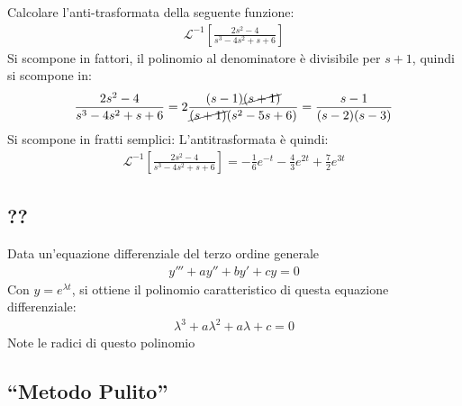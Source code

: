 \documentclass{article}
\numberwithin{equation}{subsection}
\begin{document}
Calcolare l'anti-trasformata della seguente funzione:
\begin{gather*}
    \mathscr{L}^{-1}\left[\frac{2s^2-4}{s^3-4s^2+s+6}\right]
\end{gather*}
Si scompone in fattori, il polinomio al denominatore è divisibile per $s+1$, quindi si scompone in:
\begin{gather*}
    \frac{2s^2-4}{s^3-4s^2+s+6}=2\frac{(s-1)\cancel{(s+1)}}{\cancel{(s+1)}(s^2-5s+6)}=\frac{s-1}{(s-2)(s-3)}
\end{gather*}
Si scompone in fratti semplici:
L'antitrasformata è quindi:
\begin{gather*}
    \mathscr{L}^{-1}\left[\frac{2s^2-4}{s^3-4s^2+s+6}\right]=-\frac{1}{6}e^{-t}-\frac{4}{3}e^{2t}+\frac{7}{2}e^{3t}
\end{gather*}


\subsection{??}

Data un'equazione differenziale del terzo ordine generale
\begin{gather*}
    y'''+ay''+by'+cy=0
\end{gather*}
Con $y=e^{\lambda t}$, si ottiene il polinomio caratteristico di questa equazione differenziale:
\begin{gather*}
    \lambda^3+a\lambda^2+a\lambda+c=0
\end{gather*}
Note le radici di questo polinomio %

\subsection{``Metodo Pulito''}
\end{document}
